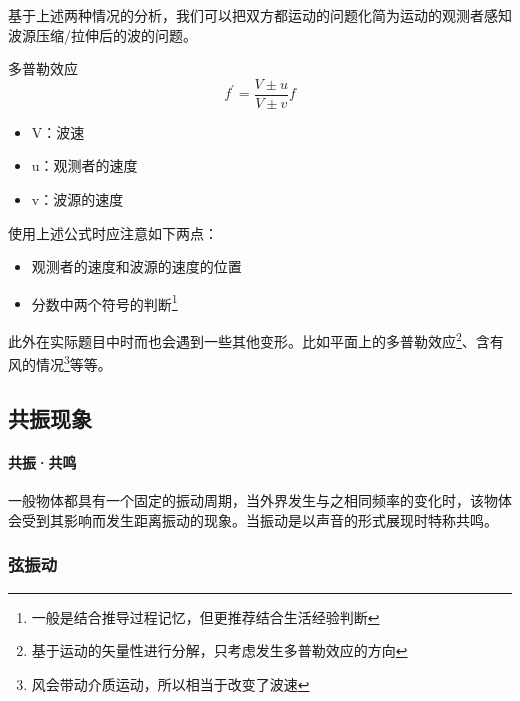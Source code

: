基于上述两种情况的分析，我们可以把双方都运动的问题化简为运动的观测者感知波源压缩/拉伸后的波的问题。
\begin{itembox}[l]{多普勒效应}
    \begin{equation*}
        f^\prime=\frac{V\pm u}{V\pm v}f
    \end{equation*}
    \begin{itemize}
        \item V：波速
        \item u：观测者的速度
        \item v：波源的速度
    \end{itemize}
\end{itembox}
使用上述公式时应注意如下两点：
\begin{itemize}
    \item 观测者的速度和波源的速度的位置
    \item 分数中两个符号的判断\footnote{一般是结合推导过程记忆，但更推荐结合生活经验判断}
\end{itemize}
此外在实际题目中时而也会遇到一些其他变形。比如平面上的多普勒效应\footnote{基于运动的矢量性进行分解，只考虑发生多普勒效应的方向}、含有风的情况\footnote{风会带动介质运动，所以相当于改变了波速}等等。

\subsection{共振现象}

\paragraph{共振·共鸣}一般物体都具有一个固定的振动周期，当外界发生与之相同频率的变化时，该物体会受到其影响而发生距离振动的现象。当振动是以声音的形式展现时特称共鸣。

\subsubsection{弦振动}

